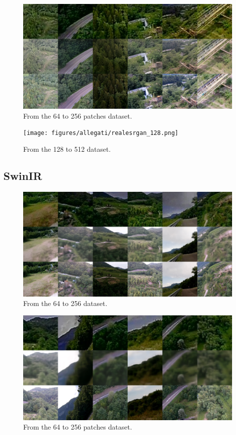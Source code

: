 \begin{figure}[H]
  \centering
  \includegraphics[scale=0.45]{figures/allegati/realesrgan_64_patches.png}
  \caption{From the 64 to 256 patches dataset.}
  \label{img:realesrgan_att}
\end{figure}

\begin{figure}[H]
  \centering
  \texttt{[image: figures/allegati/realesrgan\_128.png]}
  \caption{From the 128 to 512 dataset.}
  \label{img:realesrgan_att}
\end{figure}

\subsection{SwinIR}

\begin{figure}[H]
  \centering
  \includegraphics[scale=0.45]{figures/allegati/swinir_64.png}
  \caption{From the 64 to 256 dataset.}
  \label{img:esrgan_att}
\end{figure}

\begin{figure}[H]
  \centering
  \includegraphics[scale=0.45]{figures/allegati/swinir_64_patches.png}
  \caption{From the 64 to 256 patches dataset.}
  \label{img:esrgan_att}
\end{figure}

